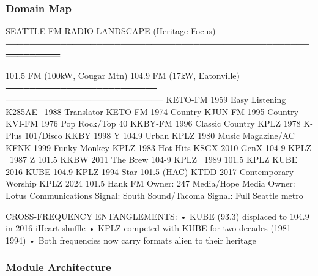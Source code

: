 \documentclass[11pt,letterpaper]{article}
\begin{document}
\subsubsection{Domain Map}

\begin{asciibox}
SEATTLE FM RADIO LANDSCAPE (Heritage Focus)
═══════════════════════════════════════════════════════════

    101.5 FM (100kW, Cougar Mtn)     104.9 FM (17kW, Eatonville)
    ─────────────────────────         ──────────────────────────
    KETO-FM  1959 Easy Listening      K285AE  ~1988 Translator
    KETO-FM  1974 Country             KJUN-FM 1995 Country
    KVI-FM   1976 Pop Rock/Top 40     KKBY-FM 1996 Classic Country
    KPLZ     1978 K-Plus 101/Disco    KKBY    1998 Y 104.9 Urban
    KPLZ     1980 Music Magazine/AC   KFNK    1999 Funky Monkey
    KPLZ     1983 Hot Hits            KSGX    2010 GenX 104-9
    KPLZ     ~1987 Z 101.5            KKBW    2011 The Brew 104-9
    KPLZ     ~1989 101.5 KPLZ         KUBE    2016 KUBE 104.9
    KPLZ     1994 Star 101.5 (HAC)    KTDD    2017 Contemporary Worship
    KPLZ     2024 101.5 Hank FM
                                      Owner: 247 Media/Hope Media
    Owner: Lotus Communications       Signal: South Sound/Tacoma
    Signal: Full Seattle metro

CROSS-FREQUENCY ENTANGLEMENTS:
  • KUBE (93.3) displaced to 104.9 in 2016 iHeart shuffle
  • KPLZ competed with KUBE for two decades (1981–1994)
  • Both frequencies now carry formats alien to their heritage
\end{asciibox}

\subsubsection{Module Architecture}
\end{document}
